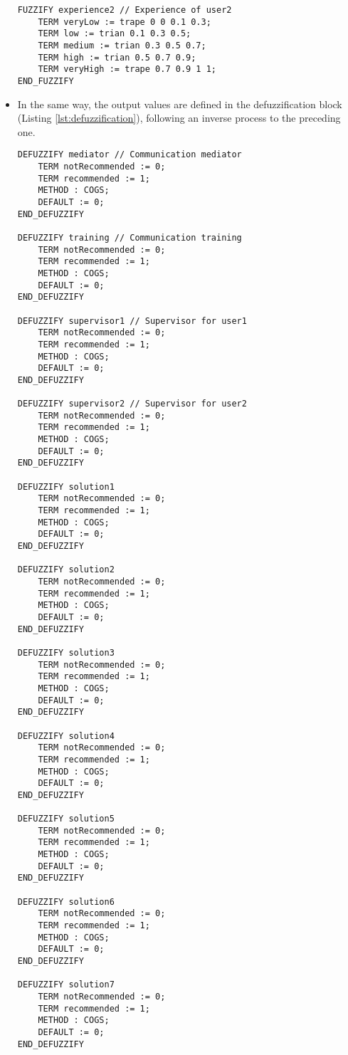 \begin{itemize}
\begin{lstlisting}[caption={[Fuzzification block]Fuzzification block}, label=lst:fuzzification]
FUZZIFY experience2 // Experience of user2
	TERM veryLow := trape 0 0 0.1 0.3;
	TERM low := trian 0.1 0.3 0.5;
	TERM medium := trian 0.3 0.5 0.7;
	TERM high := trian 0.5 0.7 0.9;
	TERM veryHigh := trape 0.7 0.9 1 1;
END_FUZZIFY
\end{lstlisting}

\vspace{16px}
\item In the same way, the output values are defined in the defuzzification block (Listing \ref{lst:defuzzification}), following an inverse process to the preceding one.

\newpage 

\begin{lstlisting}[caption={[Defuzzification block]Defuzzification block}, label=lst:defuzzification]
DEFUZZIFY mediator // Communication mediator
	TERM notRecommended := 0;
	TERM recommended := 1;
	METHOD : COGS;
	DEFAULT := 0;
END_DEFUZZIFY

DEFUZZIFY training // Communication training
	TERM notRecommended := 0;
	TERM recommended := 1;
	METHOD : COGS;
	DEFAULT := 0;
END_DEFUZZIFY

DEFUZZIFY supervisor1 // Supervisor for user1
	TERM notRecommended := 0;
	TERM recommended := 1;
	METHOD : COGS;
	DEFAULT := 0;
END_DEFUZZIFY

DEFUZZIFY supervisor2 // Supervisor for user2
	TERM notRecommended := 0;
	TERM recommended := 1;
	METHOD : COGS;
	DEFAULT := 0;
END_DEFUZZIFY

DEFUZZIFY solution1
	TERM notRecommended := 0;
	TERM recommended := 1;
	METHOD : COGS;
	DEFAULT := 0;
END_DEFUZZIFY

DEFUZZIFY solution2
	TERM notRecommended := 0;
	TERM recommended := 1;
	METHOD : COGS;
	DEFAULT := 0;
END_DEFUZZIFY

DEFUZZIFY solution3
	TERM notRecommended := 0;
	TERM recommended := 1;
	METHOD : COGS;
	DEFAULT := 0;
END_DEFUZZIFY

DEFUZZIFY solution4
	TERM notRecommended := 0;
	TERM recommended := 1;
	METHOD : COGS;
	DEFAULT := 0;
END_DEFUZZIFY

DEFUZZIFY solution5
	TERM notRecommended := 0;
	TERM recommended := 1;
	METHOD : COGS;
	DEFAULT := 0;
END_DEFUZZIFY

DEFUZZIFY solution6
	TERM notRecommended := 0;
	TERM recommended := 1;
	METHOD : COGS;
	DEFAULT := 0;
END_DEFUZZIFY

DEFUZZIFY solution7
	TERM notRecommended := 0;
	TERM recommended := 1;
	METHOD : COGS;
	DEFAULT := 0;
END_DEFUZZIFY


\end{lstlisting}
\end{itemize}
